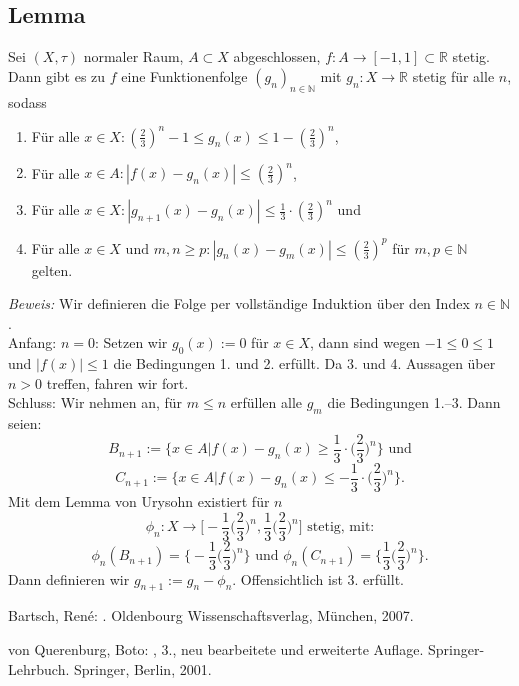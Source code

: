 \documentclass[11pt,leqno]{article}
\begin{document}
\subsection{Lemma}
Sei $(X, \tau)$ normaler Raum, $A \subset X$ abgeschlossen, $f: A \rightarrow [-1,1]\subset \mathbb{R}$ stetig.
Dann gibt es zu $f$ eine Funktionenfolge $(g_n)_{n \in \mathbb{N}}$ mit $g_n: X \rightarrow \mathbb{R}$ stetig für alle $n$, sodass
\begin{enumerate}
    \item Für alle $x \in X: (\frac{2}{3})^n -1 \leq g_n(x) \leq 1-(\frac{2}{3})^n$,
    \item Für alle $x \in A: |f(x)-g_n(x)| \leq (\frac{2}{3})^n$,
    \item Für alle $x \in X: |g_{n+1}(x) - g_n(x)| \leq \frac{1}{3} \cdot (\frac{2}{3})^n$ und
    \item Für alle $x \in X \text{ und } m,n \geq p: |g_n(x) - g_m(x)| \leq (\frac{2}{3})^p$ für $m,p \in \mathbb{N}$ gelten.
\end{enumerate}
\textit{Beweis:} Wir definieren die Folge per vollständige Induktion über den Index $n \in \mathbb{N}$. \\
Anfang: $n=0$: Setzen wir $g_0(x):=0$ für $x \in X$, dann sind wegen $-1 \leq 0 \leq 1$ und $|f(x)| \leq 1$ die Bedingungen 1. und 2.
erfüllt. Da 3. und 4. Aussagen über $n > 0$ treffen, fahren wir fort. \\
Schluss: Wir nehmen an, für $m \leq n$ erfüllen alle $g_m$ die Bedingungen 1.–3. Dann seien:
\[B_{n+1} := \biggl\{x \in A \Big\vert f(x)-g_n(x) \geq \frac{1}{3} \cdot \biggl(\frac{2}{3}\biggr)^n\biggr\} \text{ und}\]
\[C_{n+1} := \biggl\{x \in A \Big\vert f(x)-g_n(x) \leq -\frac{1}{3} \cdot \biggl(\frac{2}{3}\biggr)^n\biggr\}.\]
Mit dem Lemma von Urysohn existiert für $n$
\[\phi_n:X \rightarrow \biggl[-\frac{1}{3}\biggl(\frac{2}{3}\biggr)^n, \frac{1}{3}\biggl(\frac{2}{3}\biggr)^n\biggr] \text{ stetig, mit:}\]
\[\phi_n(B_{n+1}) = \biggl\{-\frac{1}{3}\biggl(\frac{2}{3}\biggr)^n\biggr\} \text{ und } 
\phi_n(C_{n+1}) = \biggl\{\frac{1}{3}\biggl(\frac{2}{3}\biggr)^n\biggr\}.\]
Dann definieren wir $g_{n+1} := g_n - \phi_n$. Offensichtlich ist 3. erfüllt. 


\begin{thebibliography}{99}

    {\sc Bartsch, René:}
    .
    \newblock Oldenbourg Wissenschaftsverlag, München, 2007.
    
    
    {\sc von Querenburg, Boto:}
    , 3., neu bearbeitete und erweiterte Auflage.
    \newblock Springer-Lehrbuch. Springer, Berlin, 2001.
\end{thebibliography}
\end{document}
